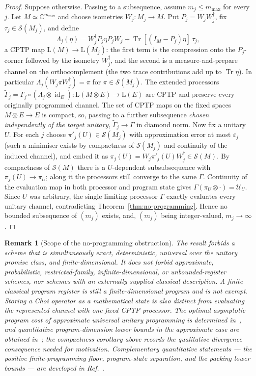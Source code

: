 \documentclass[11pt,a4paper]{article}
\newtheorem{remark}[theorem]{Remark}
\newcommand{\Lin}{\mathrm{L}}
\newcommand{\Sstate}{\mathcal{S}}
\newcommand{\Tr}{\operatorname{Tr}}
\newcommand{\id}{\operatorname{id}}
\begin{document}
\begin{proof}
Suppose otherwise. Passing to a subsequence, assume $m_j\le m_{\max}$ for every $j$. Let $M\simeq\mathbb C^{m_{\max}}$ and choose isometries $W_j:M_j\to M$. Put $P_j=W_jW_j^\dagger$, fix $\tau_j\in\Sstate(M_j)$, and define
\[
\Lambda_j(\eta)=W_j^\dagger P_j\eta P_jW_j+\Tr[(I_M-P_j)\eta]\,\tau_j,
\]
a CPTP map $\Lin(M)\to\Lin(M_j)$: the first term is the compression onto the $P_j$-corner followed by the isometry $W_j^\dagger$, and the second is a measure-and-prepare channel on the orthocomplement (the two trace contributions add up to $\Tr\eta$). In particular $\Lambda_j(W_j\pi W_j^\dagger)=\pi$ for $\pi\in\Sstate(M_j)$. The extended processors $\widetilde\Gamma_j=\Gamma_j\circ(\Lambda_j\otimes\id_E):\Lin(M\otimes E)\to\Lin(E)$ are CPTP and preserve every originally programmed channel. The set of CPTP maps on the fixed spaces $M\otimes E\to E$ is compact, so, passing to a further subsequence \emph{chosen independently of the target unitary}, $\widetilde\Gamma_j\to\Gamma$ in diamond norm. Now fix a unitary $U$. For each $j$ choose $\pi'_j(U)\in\Sstate(M_j)$ with approximation error at most $\varepsilon_j$ (such a minimiser exists by compactness of $\Sstate(M_j)$ and continuity of the induced channel), and embed it as $\pi_j(U)=W_j\pi'_j(U)W_j^\dagger\in\Sstate(M)$. By compactness of $\Sstate(M)$ there is a $U$-dependent subsubsequence with $\pi_j(U)\to\pi_U$; along it the processors still converge to the same $\Gamma$. Continuity of the evaluation map in both processor and program state gives $\Gamma(\pi_U\otimes\cdot)=\mathcal U_U$. Since $U$ was arbitrary, the single limiting processor $\Gamma$ exactly evaluates every unitary channel, contradicting Theorem~\ref{thm:no-programming}. Hence no bounded subsequence of $(m_j)$ exists, and, $(m_j)$ being integer-valued, $m_j\to\infty$.
\end{proof}

\begin{remark}[Scope of the no-programming obstruction]
\label{rem:scope}
The result forbids a scheme that is simultaneously exact, deterministic, universal over the unitary promise class, and finite-dimensional. It does not forbid approximate, probabilistic, restricted-family, infinite-dimensional, or unbounded-register schemes, nor schemes with an externally supplied classical description. A finite classical program register is still a finite-dimensional program and is not exempt. Storing a Choi operator as a mathematical state is also distinct from evaluating the represented channel with one fixed CPTP processor. The optimal asymptotic program cost of approximate universal unitary programming is determined in~\cite{YangRennerChiribella2020}, and quantitative program-dimension lower bounds in the approximate case are obtained in~\cite{KubickiPalazuelosPerezGarcia2019}; the compactness corollary above records the qualitative divergence consequence needed for motivation. Complementary quantitative statements --- the positive finite-programming floor, program-state separation, and the packing lower bounds --- are developed in Ref.~\cite{CompanionChannels}.
\end{remark}
\end{document}
